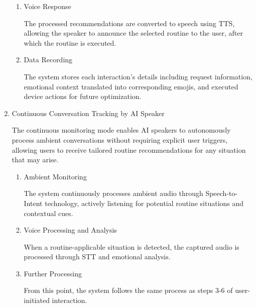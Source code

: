 \documentclass[conference]{IEEEtran}
\begin{document}
\begin{enumerate}[label=\arabic*]
\begin{enumerate}[label=\arabic*)]
        \item Voice Response \par
        \vspace{0.3em}
        The processed recommendations are converted to speech using TTS, allowing the speaker to announce the selected routine to the user, after which the routine is executed.

        \vspace{0.5em}

        \item Data Recording\par
        \vspace{0.3em}
        The system stores each interaction's details including request information, emotional context translated into corresponding emojis, and executed device actions for future optimization.
        
    \end{enumerate}

    \vspace{1em}

    \item Continuous Conversation Tracking by AI Speaker\par
    \vspace{0.3em}
    The continuous monitoring mode enables AI speakers to autonomously process ambient conversations without requiring explicit user triggers, allowing users to receive tailored routine recommendations for any situation that may arise.
    \vspace{0.3em}

    \begin{enumerate}[label=\arabic*)]
        \item Ambient Monitoring\par
        \vspace{0.3em}
        The system continuously processes ambient audio through Speech-to-Intent technology, actively listening for potential routine situations and contextual cues.

        \vspace{0.5em}

        \item Voice Processing and Analysis\par
        \vspace{0.3em}
        When a routine-applicable situation is detected, the captured audio is processed through STT and emotional analysis.

        \vspace{0.5em}

        \item Further Processing\par
        \vspace{0.3em}
         From this point, the system follows the same process as steps 3-6 of user-initiated interaction.
         
    \end{enumerate}
\end{enumerate}
\end{document}
